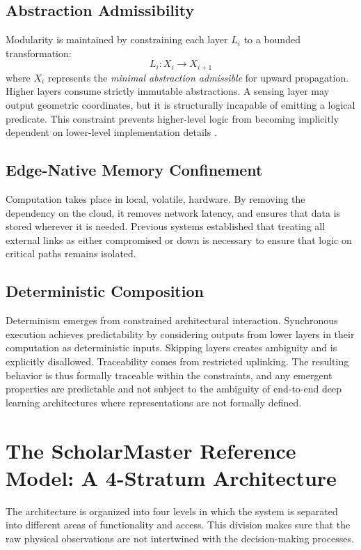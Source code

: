 \documentclass[conference]{IEEEtran}
\begin{document}
\subsection{Abstraction Admissibility}
Modularity is maintained by constraining each layer $L_i$ to a bounded transformation:
\begin{equation}
L_i : X_i \to X_{i+1}
\end{equation}
where $X_i$ represents the \textit{minimal abstraction admissible} for upward propagation. Higher layers consume strictly immutable abstractions. A sensing layer may output geometric coordinates, but it is structurally incapable of emitting a logical predicate. This constraint prevents higher-level logic from becoming implicitly dependent on lower-level implementation details \cite{b12, b20}.

\subsection{Edge-Native Memory Confinement}
Computation takes place in local, volatile, hardware. By removing the dependency on the cloud, it removes network latency, and ensures that data is stored wherever it is needed. Previous systems established that treating all external links as either compromised or down is necessary to ensure that logic on critical paths remains isolated.

\subsection{Deterministic Composition}
Determinism emerges from constrained architectural interaction. Synchronous execution achieves predictability by considering outputs from lower layers in their computation as deterministic inputs. Skipping layers creates ambiguity and is explicitly disallowed. Traceability comes from restricted uplinking. The resulting behavior is thus formally traceable within the constraints, and any emergent properties are predictable and not subject to the ambiguity of end-to-end deep learning architectures where representations are not formally defined.

\section{The ScholarMaster Reference Model: A 4-Stratum Architecture}
The architecture is organized into four levels in which the system is separated into different areas of functionality and access. This division makes sure that the raw physical observations are not intertwined with the decision-making processes.
\end{document}
